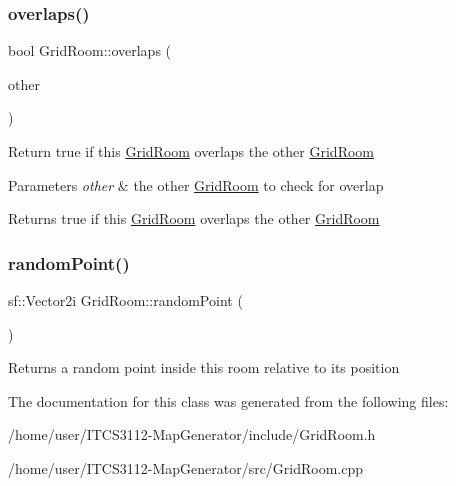 \subsubsection{\texorpdfstring{overlaps()}{overlaps()}}
{\footnotesize\ttfamily bool Grid\+Room\+::overlaps (\begin{DoxyParamCaption}\item[{\hyperlink{classGridRoom}{Grid\+Room}}]{other }\end{DoxyParamCaption})}

Return true if this \hyperlink{classGridRoom}{Grid\+Room} overlaps the other \hyperlink{classGridRoom}{Grid\+Room}


\begin{DoxyParams}{Parameters}
{\em other} & the other \hyperlink{classGridRoom}{Grid\+Room} to check for overlap \\
\hline
\end{DoxyParams}
\begin{DoxyReturn}{Returns}
true if this \hyperlink{classGridRoom}{Grid\+Room} overlaps the other \hyperlink{classGridRoom}{Grid\+Room} 
\end{DoxyReturn}
\mbox{\label{classGridRoom_a9ba94d43f72a42d82c75dfb72debe617}} 
\subsubsection{\texorpdfstring{random\+Point()}{randomPoint()}}
{\footnotesize\ttfamily sf\+::\+Vector2i Grid\+Room\+::random\+Point (\begin{DoxyParamCaption}{ }\end{DoxyParamCaption})}

\begin{DoxyReturn}{Returns}
a random point inside this room relative to its position 
\end{DoxyReturn}


The documentation for this class was generated from the following files\+:\begin{DoxyCompactItemize}
\item 
/home/user/\+I\+T\+C\+S3112-\/\+Map\+Generator/include/Grid\+Room.\+h\item 
/home/user/\+I\+T\+C\+S3112-\/\+Map\+Generator/src/Grid\+Room.\+cpp\end{DoxyCompactItemize}

